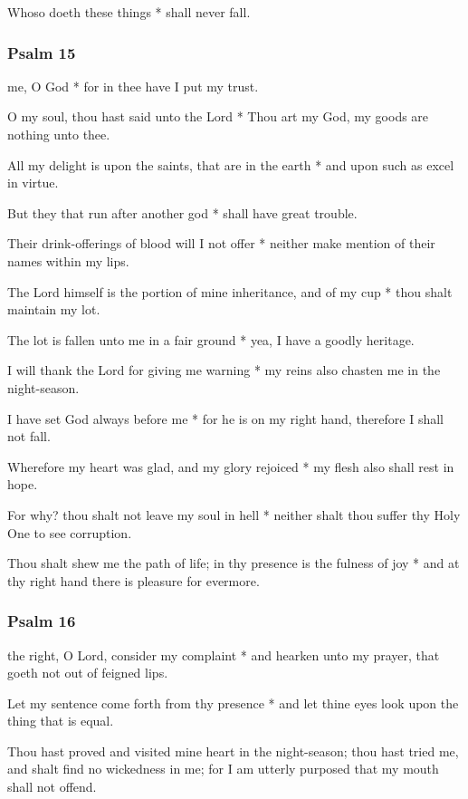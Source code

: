 Whoso doeth these things * shall never fall.

\subsubsection{Psalm 15}


 me, O God * for in thee have I put my trust.

O my soul, thou hast said unto the Lord * Thou art my God, my goods are nothing unto thee.

All my delight is upon the saints, that are in the earth * and upon such as excel in virtue.

But they that run after another god * shall have great trouble.

Their drink-offerings of blood will I not offer * neither make mention of their names within my lips.

The Lord himself is the portion of mine inheritance, and of my cup * thou shalt maintain my lot.

The lot is fallen unto me in a fair ground * yea, I have a goodly heritage.

I will thank the Lord for giving me warning * my reins also chasten me in the night-season.

I have set God always before me * for he is on my right hand, therefore I shall not fall.

Wherefore my heart was glad, and my glory rejoiced * my flesh also shall rest in hope.

For why? thou shalt not leave my soul in hell * neither shalt thou suffer thy Holy One to see corruption.

Thou shalt shew me the path of life; in thy presence is the fulness of joy * and at thy right hand there is pleasure for evermore.

\subsubsection{Psalm 16}


 the right, O Lord, consider my complaint * and hearken unto my prayer, that goeth not out of feigned lips.

Let my sentence come forth from thy presence * and let thine eyes look upon the thing that is equal.

Thou hast proved and visited mine heart in the night-season; thou hast tried me, and shalt find no wickedness in me; for I am utterly purposed that my mouth shall not offend.

